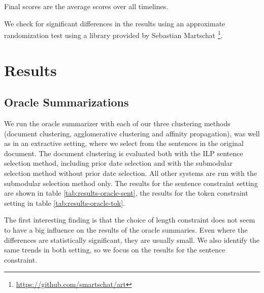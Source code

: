 \documentclass[a4paper,BCOR=10mm]{report}
\numberwithin{lemma}{chapter}
\numberwithin{definition}{chapter}
\begin{document}
Final scores are the average scores over all timelines.

We check for significant differences in the results using an approximate randomization test \citep{art} using a library provided by Sebastian Martschat \footnote{\url{https://github.com/smartschat/art}}. %

\section{Results}

\subsection{Oracle Summarizations}

We run the oracle summarizer with each of our three clustering methods (document clustering, agglomerative clustering and affinity propagation), was well as in an extractive setting, where we select from the sentences in the original document.
The document clustering is evaluated both with the ILP sentence selection method, including prior date selection and with the submodular selection method without prior date selection.
All other systems are run with the submodular selection method only.
The results for the sentence constraint setting are shown in table \ref{tab:results-oracle-sent}, the results for the token constraint setting in table \ref{tab:results-oracle-tok}.

The first interesting finding is that the choice of length constraint does not seem to have a big influence on the results of the oracle summaries. Even where the differences are statistically significant, they are usually small.
We also identify the same trends in both setting, so we focus on the results for the sentence constraint.
\end{document}
